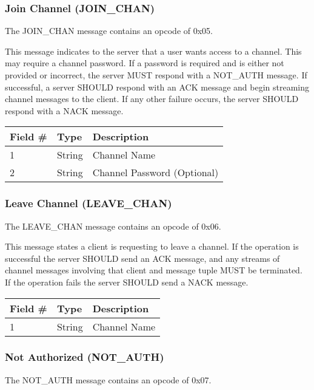 \documentclass[12pt]{article}
\begin{document}
\subsubsection{Join Channel (JOIN\_CHAN)}
The JOIN\_CHAN message contains an opcode of 0x05.

This message indicates to the server that a user wants access to a channel. This
may require a channel password. If a password is required and is either not
provided or incorrect, the server MUST respond with a NOT\_AUTH message. If
successful, a server SHOULD respond with an ACK message and begin streaming
channel messages to the client. If any other failure occurs, the server SHOULD
respond with a NACK message.

\begin{table}[ht]
\begin{tabular} {|l|l|l|}
    \hline 
    Field \# & Type & Description \\
    \hline
    1 & String & Channel Name \\
    2 & String & Channel Password (Optional) \\
    \hline
\end{tabular}
\end{table}

\subsubsection{Leave Channel (LEAVE\_CHAN)}
The LEAVE\_CHAN message contains an opcode of 0x06.

This message states a client is requesting to leave a channel. If the operation
is successful the server SHOULD send an ACK message, and any streams of channel messages
involving that client and message tuple MUST be terminated. If the operation
fails the server SHOULD send a NACK message.

\begin{table}[ht]
\begin{tabular} {|l|l|l|}
    \hline 
    Field \# & Type & Description \\
    \hline
    1 & String & Channel Name \\
    \hline
\end{tabular}
\end{table}

\subsubsection{Not Authorized (NOT\_AUTH)}
The NOT\_AUTH message contains an opcode of 0x07.
\end{document}
